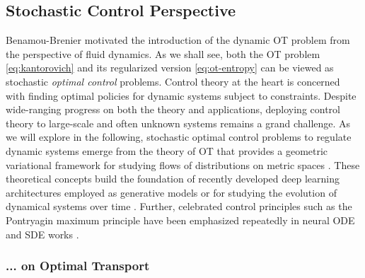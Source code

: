 \subsection{Stochastic Control Perspective} \label{sec:background_control}

Benamou-Brenier motivated the introduction of the dynamic \acrlong{OT} problem from the perspective of fluid dynamics.
As we shall see, both the \acrshort{OT} problem \eqref{eq:kantorovich} and its regularized version \eqref{eq:ot-entropy} can be viewed as stochastic \textit{optimal control} problems.
Control theory at the heart is concerned with finding optimal policies for dynamic systems subject to constraints. Despite wide-ranging progress on both the theory and applications, deploying control theory to large-scale and often unknown systems remains a grand challenge.
As we will explore in the following, stochastic optimal control problems to regulate dynamic systems emerge from the theory of \acrlong{OT} \citep{santambrogio2015optimal} that provides a geometric variational framework for studying flows of distributions on metric spaces \citep{chen2021optimal}.
These theoretical concepts build the foundation of recently developed deep learning architectures employed as generative models \citep{song2020score, de2021diffusion} or for studying the evolution of dynamical systems over time \citep{chen2021likelihood, bunne2022proximal, vargas2021solving}.
Further, celebrated control principles such as the Pontryagin maximum principle have been emphasized repeatedly in neural \acrlong{ODE} \citep{chen2018neural} and \acrlong{SDE} works \citep{jia2019neural}.

\subsubsection*{... on Optimal Transport} \label{sec:background_control_ot}

